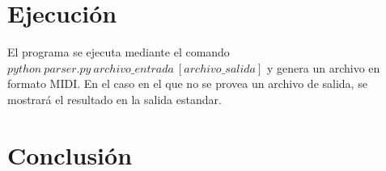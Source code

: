 \documentclass[a4paper, 10pt, twoside]{article}
\begin{document}
\section{Ejecución}
El programa se ejecuta mediante el comando $python\ parser.py\ archivo\_entrada\ [archivo\_salida]$ y genera un archivo en formato MIDI. En el caso en el que no se provea un archivo de salida, se mostrará el resultado en la salida estandar. 



\section{Conclusión}
\end{document}
